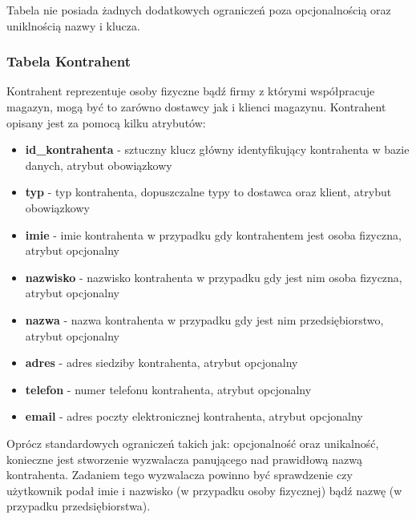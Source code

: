 Tabela nie posiada żadnych dodatkowych ograniczeń poza opcjonalnością oraz
uniklnością nazwy i klucza.

\subsubsection{Tabela Kontrahent}
Kontrahent reprezentuje osoby fizyczne bądź firmy z którymi współpracuje
magazyn, mogą być to zarówno dostawcy jak i klienci magazynu. Kontrahent opisany
jest za pomocą kilku atrybutów:
\begin{itemize}
  \item \textbf{id\_kontrahenta} - sztuczny klucz główny identyfikujący
  kontrahenta w bazie danych, atrybut obowiązkowy
  \item \textbf{typ} - typ kontrahenta, dopuszczalne typy to dostawca oraz
  klient, atrybut obowiązkowy
  \item \textbf{imie} - imie kontrahenta w przypadku gdy kontrahentem jest osoba
  fizyczna, atrybut opcjonalny
  \item \textbf{nazwisko} - nazwisko kontrahenta w przypadku gdy jest nim osoba
  fizyczna, atrybut opcjonalny
  \item \textbf{nazwa} - nazwa kontrahenta w przypadku gdy jest nim
  przedsiębiorstwo, atrybut opcjonalny 
  \item \textbf{adres} - adres siedziby kontrahenta, atrybut opcjonalny
  \item \textbf{telefon} - numer telefonu kontrahenta, atrybut opcjonalny
  \item \textbf{email} - adres poczty elektronicznej kontrahenta, atrybut
  opcjonalny
\end{itemize}

Oprócz standardowych ograniczeń takich jak: opcjonalność oraz unikalność,
konieczne jest stworzenie wyzwalacza panującego nad prawidłową nazwą
kontrahenta. Zadaniem tego wyzwalacza powinno być sprawdzenie czy użytkownik
podał imie i nazwisko (w przypadku osoby fizycznej) bądź nazwę (w przypadku
przedsiębiorstwa).

